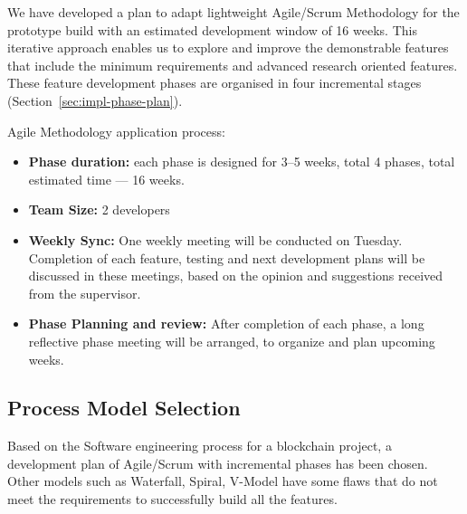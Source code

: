 \documentclass[12pt,a4paper]{report}
\begin{document}
We have developed a plan to adapt lightweight Agile/Scrum Methodology for the prototype build with an estimated development window of 16 weeks. This iterative approach enables us to explore and improve the demonstrable features that include the minimum requirements and advanced research oriented features. These feature development phases are organised in four incremental stages (Section~\ref{sec:impl-phase-plan}).

Agile Methodology application process:
\begin{itemize}[noitemsep]
\item \textbf{Phase duration:} each phase is designed for 3--5 weeks, total 4 phases, total estimated time --- 16 weeks.
\item \textbf{Team Size:} 2 developers
\item \textbf{Weekly Sync:} One weekly meeting will be conducted on Tuesday. Completion of each feature, testing and next development plans will be discussed in these meetings, based on the opinion and suggestions received from the supervisor.
\item \textbf{Phase Planning and review:} After completion of each phase, a long reflective phase meeting will be arranged, to organize and plan upcoming weeks.
\end{itemize}

\subsection{Process Model Selection}
\label{sec:process-model-selection}
\label{sec:mvc-pattern}

Based on the Software engineering process for a blockchain project, a development plan of Agile/Scrum with incremental phases has been chosen. Other models such as Waterfall, Spiral, V-Model have some flaws that do not meet the requirements to successfully build all the features.
\end{document}
